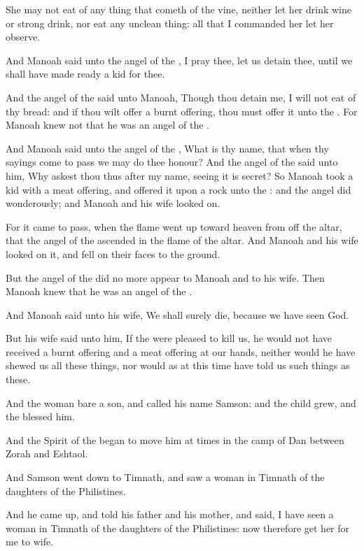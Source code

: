 \Verse She may not eat of any thing that cometh of the vine, neither let her drink wine or strong drink, nor eat any unclean thing: all that I commanded her let her observe.

\Verse And Manoah said unto the angel of the \LORD, I pray thee, let us detain thee, until we shall have made ready a kid for thee.

\Verse And the angel of the \LORD said unto Manoah, Though thou detain me, I will not eat of thy bread: and if thou wilt offer a burnt offering, thou must offer it unto the \LORD. For Manoah knew not that he was an angel of the \LORD.

\Verse And Manoah said unto the angel of the \LORD, What is thy name, that when thy sayings come to pass we may do thee honour?  \Verse And the angel of the \LORD said unto him, Why askest thou thus after my name, seeing it is secret?  \Verse So Manoah took a kid with a meat offering, and offered it upon a rock unto the \LORD: and the angel did wonderously; and Manoah and his wife looked on.

\Verse For it came to pass, when the flame went up toward heaven from off the altar, that the angel of the \LORD ascended in the flame of the altar. And Manoah and his wife looked on it, and fell on their faces to the ground.

\Verse But the angel of the \LORD did no more appear to Manoah and to his wife. Then Manoah knew that he was an angel of the \LORD.

\Verse And Manoah said unto his wife, We shall surely die, because we have seen God.

\Verse But his wife said unto him, If the \LORD were pleased to kill us, he would not have received a burnt offering and a meat offering at our hands, neither would he have shewed us all these things, nor would as at this time have told us such things as these.

\Verse And the woman bare a son, and called his name Samson: and the child grew, and the \LORD blessed him.

\Verse And the Spirit of the \LORD began to move him at times in the camp of Dan between Zorah and Eshtaol.


\Chapter
\Verse And Samson went down to Timnath, and saw a woman in Timnath of the daughters of the Philistines.

\Verse And he came up, and told his father and his mother, and said, I have seen a woman in Timnath of the daughters of the Philistines: now therefore get her for me to wife.

